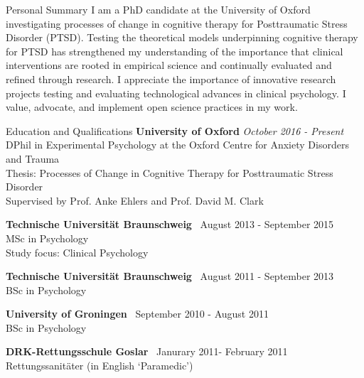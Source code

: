 \documentclass{resume} %
\begin{document}

\begin{rSection}{Personal Summary}
I am a PhD candidate at the University of Oxford investigating processes of change in cognitive therapy for Posttraumatic Stress Disorder (PTSD).
Testing the theoretical models underpinning cognitive therapy for PTSD has strengthened my understanding of the importance that clinical interventions are rooted in empirical science and
continually evaluated and refined through research. 
I appreciate the importance of innovative research projects testing and evaluating technological advances in clinical psychology.
I value, advocate, and implement open science practices in my work.
\end{rSection}


\begin{rSection}{Education and Qualifications}
{\bf University of Oxford} \hfill {\em October 2016 - Present} \\ 
DPhil in Experimental Psychology at the Oxford Centre for Anxiety Disorders and Trauma \smallskip \\
Thesis: Processes of Change in Cognitive Therapy for Posttraumatic Stress Disorder \\
Supervised by Prof. Anke Ehlers and Prof. David M. Clark \smallskip

{\bf Technische Universit{\"a}t Braunschweig} \hfill {\ August 2013 - September 2015} \\ 
MSc in Psychology \\
Study  focus: Clinical Psychology \smallskip

{\bf Technische Universit{\"a}t Braunschweig} \hfill {\ August 2011 - September 2013} \\ 
BSc in Psychology \smallskip

{\bf University of Groningen} \hfill {\ September 2010 - August 2011} \\ 
BSc in Psychology \smallskip

{\bf DRK-Rettungsschule Goslar} \hfill {\ Janurary 2011- February 2011} \\ 
Rettungssanit{\"a}ter (in English `Paramedic') \smallskip

\end{rSection}
\end{document}
